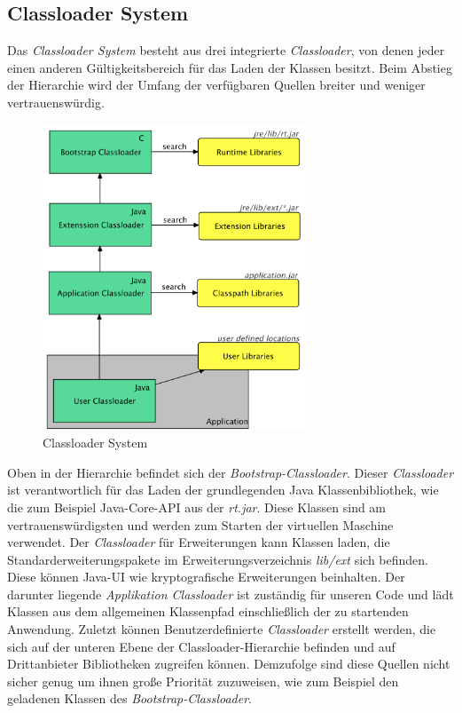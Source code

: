 \subsection{Classloader System}
Das \textit{Classloader System} besteht aus drei integrierte \textit{Classloader}, von denen jeder einen anderen Gültigkeitsbereich für das Laden der Klassen besitzt. Beim Abstieg der Hierarchie wird der Umfang der verfügbaren Quellen breiter und weniger vertrauenswürdig. 
\begin{figure}[h!]
  \centering
  \includegraphics[width=0.7\textwidth]{material/images/Classloader.png}
  \caption{Classloader System}
  \label{fig:Classloader}
\end{figure}
\newline
Oben in der Hierarchie befindet sich der \textit{Bootstrap-Classloader}. Dieser \textit{Classloader} ist verantwortlich für das Laden der grundlegenden Java Klassenbibliothek, wie die zum Beispiel Java-Core-API aus der \textit{rt.jar}. Diese Klassen sind am vertrauenswürdigsten und werden zum Starten der virtuellen Maschine verwendet. Der \textit{Classloader} für Erweiterungen kann Klassen laden, die Standarderweiterungspakete im Erweiterungsverzeichnis \textit{lib/ext} sich befinden. Diese können Java-UI wie kryptografische Erweiterungen beinhalten. Der darunter liegende \textit{Applikation Classloader} ist zuständig für unseren Code und lädt Klassen aus dem allgemeinen Klassenpfad einschließlich der zu startenden Anwendung. Zuletzt können Benutzerdefinierte \textit{Classloader} erstellt werden, die sich auf der unteren Ebene der Classloader-Hierarchie befinden und auf Drittanbieter Bibliotheken zugreifen können. Demzufolge sind diese Quellen nicht sicher genug um ihnen große Priorität zuzuweisen, wie zum Beispiel den geladenen Klassen des \textit{Bootstrap-Classloader}. 
